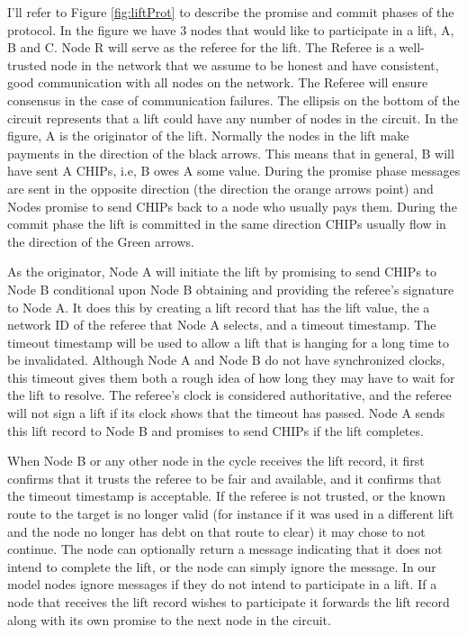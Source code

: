 \documentclass[article, onecolumn, 12pt]{IEEEtran}
\begin{document}
I'll refer to Figure \ref{fig:liftProt} to describe the promise and commit phases of the protocol. In the figure we have 3 nodes that would like to participate in a lift, A, B and C. Node R will serve as the referee for the lift.
The Referee is a well-trusted node in the network that we assume to be honest and have consistent, good communication with all nodes on the network. The Referee will ensure consensus in the case of communication failures.
The ellipsis on the bottom of the circuit represents that a lift could have any number of nodes in the circuit. In the figure, A is the originator of the lift.
Normally the nodes in the lift make payments in the direction of the black arrows. This means that in general, B will have sent A CHIPs, i.e, B owes A some value. During the promise phase messages are sent in the opposite direction (the direction the orange arrows point) and Nodes promise to send CHIPs back to a node who usually pays them. During the commit phase the lift is committed in the same direction CHIPs usually flow in the direction of the Green arrows.

As the originator, Node A will initiate the lift by promising to send CHIPs to Node B conditional upon Node B obtaining and providing the referee's signature to Node A. It does this by creating a lift record that has the lift value, the a network ID of the referee that Node A selects, and a timeout timestamp.
The timeout timestamp will be used to allow a lift that is hanging for a long time to be invalidated.
Although Node A and Node B do not have synchronized clocks, this timeout gives them both a rough idea of how long they may have to wait for the lift to resolve.
The referee's clock is considered authoritative, and the referee will not sign a lift if its clock shows that the timeout has passed. Node A sends this lift record to Node B and promises to send CHIPs if the lift completes.

When Node B or any other node in the cycle receives the lift record, it first confirms that it trusts the referee to be fair and available, and it confirms that the timeout timestamp is acceptable. If the referee is not trusted, or the known route to the target is no longer valid (for instance if it was used in a different lift and the node no longer has debt on that route to clear) it may chose to not continue. The node can optionally return a message indicating that it does not intend to complete the lift, or the node can simply ignore the message. In our model nodes ignore messages if they do not intend to participate in a lift. If a node that receives the lift record wishes to participate it forwards the lift record along with its own promise to the next node in the circuit. 
\end{document}
